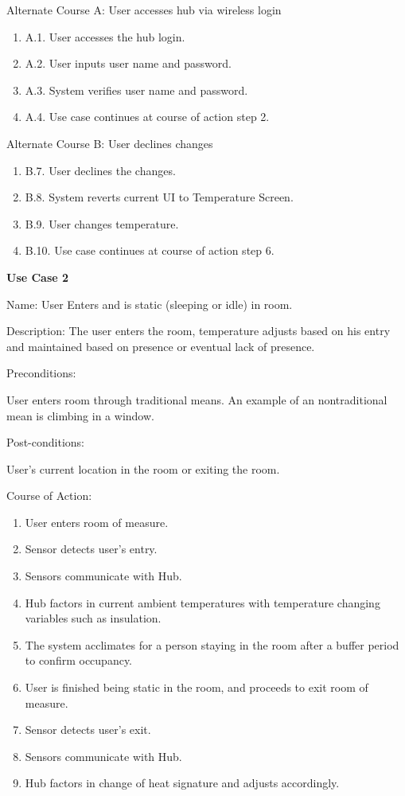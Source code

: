 \documentclass{article}
\begin{document}
\begin{flushleft}
Alternate Course A: User accesses hub via wireless login
\end{flushleft}
\begin{enumerate}
    \item A.1. User accesses the hub login.
    \item A.2. User inputs user name and password.
    \item A.3. System verifies user name and password.
    \item A.4. Use case continues at course of action step 2.
\end{enumerate}
\begin{flushleft}
Alternate Course B: User declines changes
\end{flushleft}
\begin{enumerate}
    \item B.7. User declines the changes.
    \item B.8. System reverts current \gls{UI} to Temperature Screen.
    \item B.9. User changes temperature.
    \item B.10. Use case continues at course of action step 6.
\end{enumerate}
\begin{flushleft}
\textbf{Use Case 2}

Name: User Enters and is static (sleeping or idle) in room.

Description: The user enters the room, temperature adjusts based on his entry and maintained based on presence or eventual lack of presence.

Preconditions:

User enters room through traditional means. An example of an nontraditional mean is climbing in a window.

Post-conditions:

User's current location in the room or exiting the room.

Course of Action:
\end{flushleft}
\begin{enumerate}
    \item User enters room of measure.
    \item Sensor detects user's entry.
    \item Sensors communicate with Hub.
    \item Hub factors in current ambient temperatures with temperature changing variables such as insulation.
    \item The system acclimates for a person staying in the room after a buffer period to confirm occupancy.
    \item User is finished being static in the room, and proceeds to exit room of measure.
    \item Sensor detects user's exit.
    \item Sensors communicate with Hub.
    \item Hub factors in change of heat signature and adjusts accordingly.
\end{enumerate}
\end{document}
